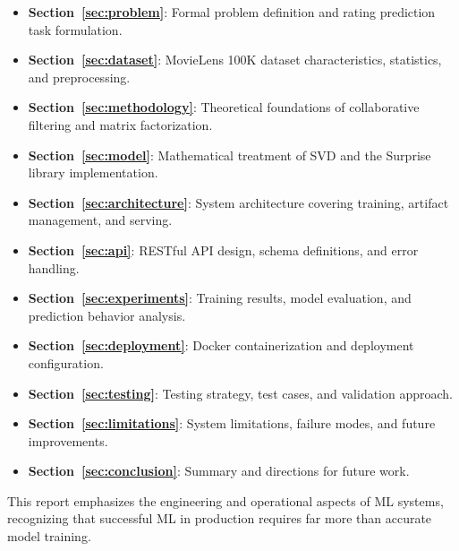 \begin{itemize}
  \item \textbf{Section~\ref{sec:problem}}: Formal problem definition and rating prediction task formulation.
  
  \item \textbf{Section~\ref{sec:dataset}}: MovieLens 100K dataset characteristics, statistics, and preprocessing.
  
  \item \textbf{Section~\ref{sec:methodology}}: Theoretical foundations of collaborative filtering and matrix factorization.
  
  \item \textbf{Section~\ref{sec:model}}: Mathematical treatment of SVD and the Surprise library implementation.
  
  \item \textbf{Section~\ref{sec:architecture}}: System architecture covering training, artifact management, and serving.
  
  \item \textbf{Section~\ref{sec:api}}: RESTful API design, schema definitions, and error handling.
  
  \item \textbf{Section~\ref{sec:experiments}}: Training results, model evaluation, and prediction behavior analysis.
  
  \item \textbf{Section~\ref{sec:deployment}}: Docker containerization and deployment configuration.
  
  \item \textbf{Section~\ref{sec:testing}}: Testing strategy, test cases, and validation approach.
  
  \item \textbf{Section~\ref{sec:limitations}}: System limitations, failure modes, and future improvements.
  
  \item \textbf{Section~\ref{sec:conclusion}}: Summary and directions for future work.
\end{itemize}

\vspace{0.5cm}

This report emphasizes the engineering and operational aspects of ML systems, recognizing that 
successful ML in production requires far more than accurate model training.
